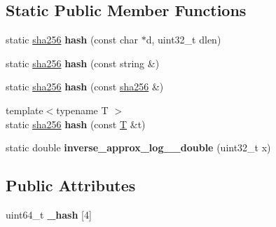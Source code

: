 \subsection*{Static Public Member Functions}
\begin{DoxyCompactItemize}
\item 
\mbox{\label{classfc_1_1sha256_aef7756d6110f804309255e757af07134}} 
static \mbox{\hyperlink{classfc_1_1sha256}{sha256}} {\bfseries hash} (const char $\ast$d, uint32\+\_\+t dlen)
\item 
\mbox{\label{classfc_1_1sha256_a6bbfcc4186190652df222355a47fbf0e}} 
static \mbox{\hyperlink{classfc_1_1sha256}{sha256}} {\bfseries hash} (const string \&)
\item 
\mbox{\label{classfc_1_1sha256_aef21a212a2ed981147e0f645ee9297eb}} 
static \mbox{\hyperlink{classfc_1_1sha256}{sha256}} {\bfseries hash} (const \mbox{\hyperlink{classfc_1_1sha256}{sha256}} \&)
\item 
\mbox{\label{classfc_1_1sha256_acef8280edbea7c27db491f4c90ceee5a}} 
{\footnotesize template$<$typename T $>$ }\\static \mbox{\hyperlink{classfc_1_1sha256}{sha256}} {\bfseries hash} (const \mbox{\hyperlink{struct_t}{T}} \&t)
\item 
\mbox{\label{classfc_1_1sha256_ac8c2c174f7a81842571a4e17b7497fa6}} 
static double {\bfseries inverse\+\_\+approx\+\_\+log\+\_\+\_\+double} (uint32\+\_\+t x)
\end{DoxyCompactItemize}
\subsection*{Public Attributes}
\begin{DoxyCompactItemize}
\item 
\mbox{\label{classfc_1_1sha256_ac933820516182c134a6473227db0e7da}} 
uint64\+\_\+t {\bfseries \+\_\+hash} \mbox{[}4\mbox{]}
\end{DoxyCompactItemize}
